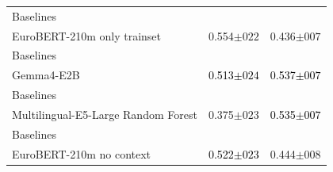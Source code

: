 \begin{tabularx}{\textwidth}{X | c c}
Baselines\\\subcatarrow{}EuroBERT-210m only trainset & \textcolor{White!50!BrickRed}{0.554$\pm{}022$} & \textcolor{White!50!NavyBlue}{0.436$\pm{}007$} \\
Baselines\\\subcatarrow{}Gemma4-E2B & \textcolor{Black}{0.513$\pm{}024$} & \textcolor{Black}{0.537$\pm{}007$} \\
Baselines\\\subcatarrow{}Multilingual-E5-Large Random Forest & \textcolor{NavyBlue}{0.375$\pm{}023$} & \textcolor{Black}{0.535$\pm{}007$} \\
Baselines\\\subcatarrow{}EuroBERT-210m no context & \textcolor{Black}{0.522$\pm{}023$} & \textcolor{White!50!NavyBlue}{0.444$\pm{}008$} \\
\hline
\end{tabularx}